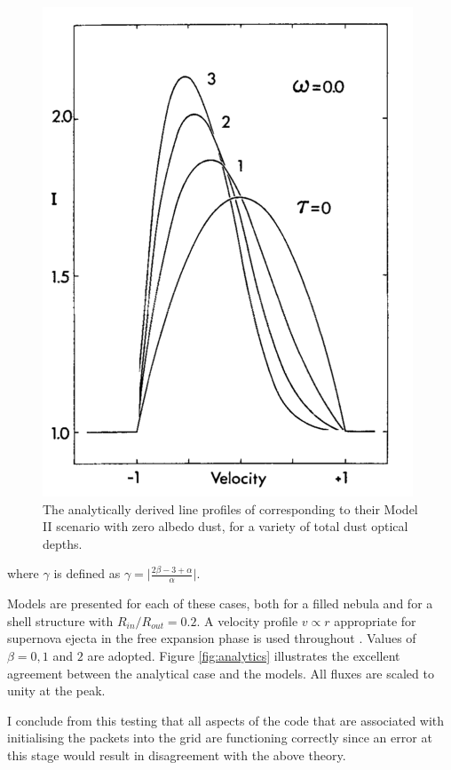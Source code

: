 \begin{figure}
\centering
\includegraphics[trim =0 0 0 0,clip=true,scale=0.6]{chapters/chapter4/images/Lucy89_Model2.png}
\caption{The analytically derived line profiles of \citet{Lucy1989} corresponding to their Model II scenario with zero albedo dust, for a variety of total dust optical depths.}
\label{fig:LucyMod2}
\end{figure}

\noindent where $\gamma$ is defined as $\gamma= \lvert 
\frac{2\beta-3+\alpha}{\alpha} \rvert$.

Models are presented for each of these cases, both for a filled nebula and for a shell structure with $R_{in}/R_{out}=0.2$.  A velocity profile $v \propto r$ appropriate for supernova ejecta in the free expansion phase is used throughout \citep{Li1992,Xu1992,McCray1996,Baron2005}.  Values of 
$\beta = 0, 1$ and $2$ are adopted.  Figure \ref{fig:analytics} 
illustrates the excellent agreement between the analytical case and the 
models.  All fluxes are scaled to unity at the peak.

I conclude from this testing that all aspects of the code that are associated with initialising the packets into the grid are functioning correctly since an error at this stage would result in disagreement with the above theory.  

